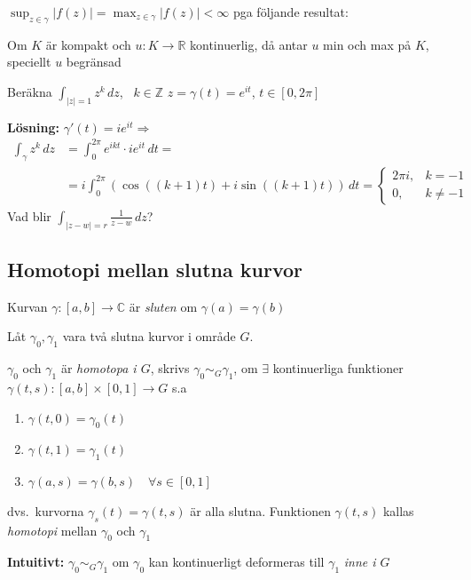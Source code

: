 \begin{note}
$\displaystyle\sup_{z \in \gamma} |f(z)| = \max_{z \in \gamma} |f(z)| < \infty$ \quad pga följande resultat:
\end{note}

\begin{theorem}[Sats A.1]
Om $K$ är kompakt och $u : K \to \mathbb{R}$ kontinuerlig, då antar $u$ min och max på $K$, speciellt $u$ begränsad
\end{theorem}

\begin{framed}
Beräkna $\displaystyle\int_{|z| = 1} z^k\,dz$, \ $k \in \mathbb{Z}$
$z = \gamma(t) = e^{it}$, $t \in [0, 2\pi]$

\textbf{Lösning:} $\gamma'(t) = ie^{it} \Rightarrow$
\begin{align*}
  \int_\gamma z^k\,dz &= \int_0^{2\pi} e^{ikt} \cdot ie^{it}\,dt = \\
  &= i\int_0^{2\pi} (\cos((k+1)t) + i\sin((k+1)t))\,dt = \begin{cases} 2\pi i, & k = -1 \\ 0, & k \neq -1 \end{cases}
\end{align*}
Vad blir $\displaystyle\int_{|z - w| = r} \frac{1}{z - w}\,dz$?
\end{framed}

\subsection{Homotopi mellan slutna kurvor}
\begin{definition}
Kurvan $\gamma : [a, b] \to \mathbb{C}$ är \emph{sluten} om $\gamma(a) = \gamma(b)$
\end{definition}

Låt $\gamma_0, \gamma_1$ vara två slutna kurvor i område $G$.

\begin{definition}
$\gamma_0$ och $\gamma_1$ är \emph{homotopa i $G$}, skrivs $\gamma_0 \sim_G \gamma_1$, om $\exists$ kontinuerliga funktioner $\gamma(t, s) : [a, b] \times [0, 1] \to G$ s.a
\begin{enumerate}[label=\roman*)]
  \item $\gamma(t, 0) = \gamma_0(t)$
  \item $\gamma(t, 1) = \gamma_1(t)$
  \item $\gamma(a, s) = \gamma(b, s) \quad \forall s \in [0, 1]$
\end{enumerate}
dvs.\ kurvorna $\gamma_s(t) = \gamma(t, s)$ är alla slutna. Funktionen $\gamma(t, s)$ kallas \emph{homotopi} mellan $\gamma_0$ och $\gamma_1$
\end{definition}

\textbf{Intuitivt:} $\gamma_0 \sim_G \gamma_1$ om $\gamma_0$ kan kontinuerligt deformeras till $\gamma_1$ \emph{inne i $G$}
